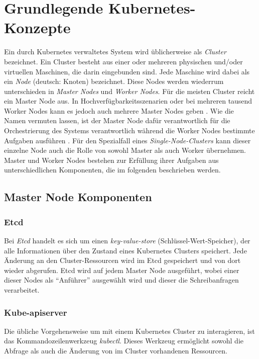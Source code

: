 \documentclass[11pt,a4paper]{article}
\begin{document}
\section{Grundlegende Kubernetes-Konzepte}
Ein durch Kubernetes verwaltetes System wird üblicherweise als \emph{Cluster} bezeichnet.
Ein Cluster besteht aus einer oder mehreren physischen und/oder virtuellen Maschinen, die darin eingebunden sind.
Jede Maschine wird dabei als ein \emph{Node} (deutsch: Knoten) bezeichnet. Diese Nodes werden wiederrum unterschieden in 
\emph{Master Nodes} und \emph{Worker Nodes}.
Für die meisten Cluster reicht ein Master Node aus. In Hochverfügbarkeitsszenarien oder bei mehreren
tausend Worker Nodes kann es jedoch auch mehrere Master Nodes geben \cite{Schmeling_Dargatz_2022}.
Wie die Namen vermuten lassen, ist der Master Node dafür verantwortlich für die Orchestrierung
des Systems verantwortlich während die Worker Nodes bestimmte Aufgaben ausführen \cite{Bentaleb_Belloum_Sebaa_El-Maouhab_2021}.
Für den Spezialfall eines \emph{Single-Node-Clusters} kann dieser einzelne Node auch die Rolle von sowohl
Master als auch Worker übernehmen.
Master und Worker Nodes bestehen zur Erfüllung ihrer Aufgaben aus unterschiedlichen Komponenten,
die im folgenden beschrieben werden.

\subsection{Master Node Komponenten}
\subsubsection{Etcd}
Bei \emph{Etcd} handelt es sich um einen \emph{key-value-store} (Schlüssel-Wert-Speicher),
der alle Informationen über den Zustand eines Kubernetes Clusters speichert.
Jede Änderung an den Cluster-Ressourcen wird im Etcd gespeichert und von dort wieder abgerufen.
Etcd wird auf jedem Master Node ausgeführt, wobei einer dieser Nodes als ``Anführer'' 
ausgewählt wird und dieser die Schreibanfragen verarbeitet.

\subsubsection{Kube-apiserver}
Die übliche Vorgehensweise um mit einem Kubernetes Cluster zu interagieren, ist das Kommandozeilenwerkzeug \emph{kubectl}.
Dieses Werkzeug ermöglicht sowohl die Abfrage als auch die Änderung von im Cluster vorhandenen Ressourcen.
\end{document}
